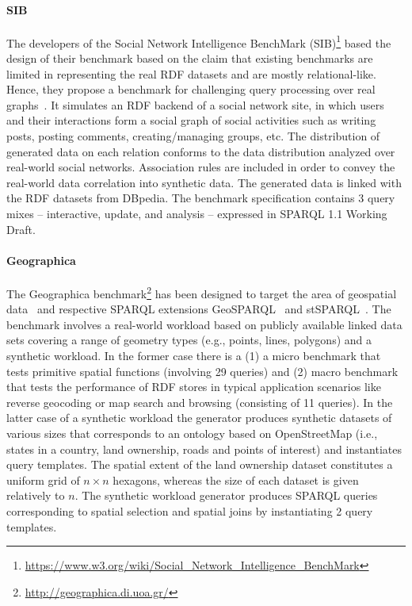 \paragraph{SIB} The developers of the Social Network Intelligence BenchMark (SIB)\footnote{\url{https://www.w3.org/wiki/Social_Network_Intelligence_BenchMark}} based the design of their benchmark based on the claim that existing benchmarks are limited in representing the real RDF datasets and are mostly relational-like. Hence, they propose a benchmark for challenging query processing over real graphs~\cite{sib}. It simulates an RDF backend of a social network site, in which users and their interactions form a social graph of social activities such as writing posts, posting comments, creating/managing groups, etc. The distribution of generated data on each relation conforms to the data distribution analyzed over real-world social networks. Association rules are included in order to convey the real-world data correlation into synthetic data. The  generated data is linked with the RDF datasets from DBpedia. The benchmark specification contains 3 query mixes -- interactive, update, and analysis -- expressed in SPARQL 1.1 Working Draft.

\paragraph{Geographica} The Geographica benchmark\footnote{\url{http://geographica.di.uoa.gr/}} has been designed to target the area of geospatial data~\cite{DBLP:conf/semweb/GarbisKK13} and respective SPARQL extensions GeoSPARQL~\cite{battle2012enabling} and stSPARQL~\cite{koubarakis2010modeling}. The benchmark involves a real-world workload based on publicly available linked data sets covering a range of geometry types (e.g., points, lines, polygons) and  a synthetic workload. In the former case there is a (1) a micro benchmark that tests primitive spatial functions (involving 29 queries) and (2) macro benchmark that tests the performance of RDF stores in typical application scenarios like reverse geocoding or map search and browsing (consisting of 11 queries). In the latter case of a synthetic workload the generator produces synthetic datasets of various sizes that corresponds to an ontology based on OpenStreetMap (i.e., states in a country, land ownership, roads and  points of interest) and instantiates query templates. The spatial extent of the land ownership dataset constitutes a uniform grid of $n \times n$ hexagons, whereas the size of each dataset is given relatively to $n$. The synthetic workload generator produces SPARQL queries corresponding to spatial selection and spatial joins by instantiating 2 query templates.


